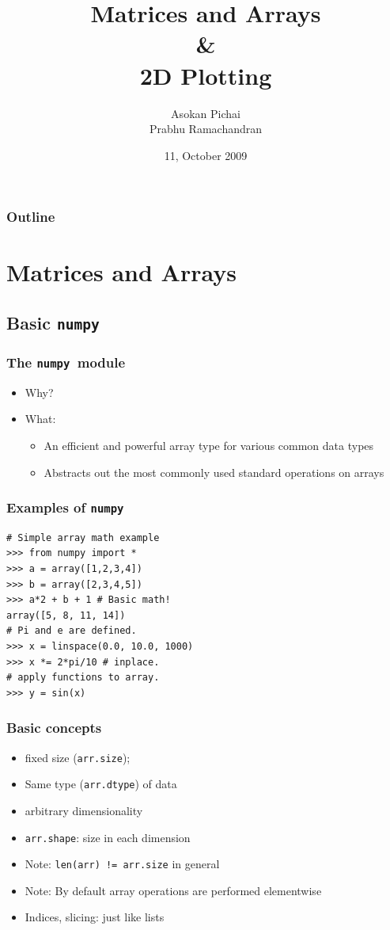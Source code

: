 \documentclass[14pt,compress]{beamer}
\title[]{Matrices and Arrays\\ \& \\2D Plotting}
\author[Asokan \& Prabhu] {Asokan Pichai\\Prabhu Ramachandran}
\institute[FOSSEE] {FOSSEE Team}
\date[] {11, October 2009}
\newcounter{time}
\newcommand{\inctime}[1]{\addtocounter{time}{#1}{\tiny \thetime\ m}}
\newcommand{\typ}[1]{\texttt{#1}}
\begin{document}
\begin{frame}
  \maketitle
\end{frame}

\begin{frame}
  \frametitle{Outline}
  \tableofcontents
\end{frame}

\section{Matrices and Arrays}

\subsection{Basic \typ{numpy} }

\newcommand{\num}{\texttt{numpy}}

\begin{frame}
  \frametitle{The \num\ module}
  \begin{itemize}
      \item Why?
  \item What:
    \begin{itemize}
    \item An efficient and powerful array type for various common data
      types
    \item Abstracts out the most commonly used standard operations on
      arrays
    \end{itemize}
  \end{itemize}
\end{frame}

\begin{frame}[fragile]
  \frametitle{Examples of \num}
\begin{lstlisting}
# Simple array math example
>>> from numpy import *
>>> a = array([1,2,3,4])
>>> b = array([2,3,4,5])
>>> a*2 + b + 1 # Basic math!
array([5, 8, 11, 14])
# Pi and e are defined.
>>> x = linspace(0.0, 10.0, 1000)
>>> x *= 2*pi/10 # inplace.
# apply functions to array.
>>> y = sin(x)
\end{lstlisting}
\inctime{5}
\end{frame}

\begin{frame}
  \frametitle{Basic concepts}
  \begin{itemize}
  \item fixed size (\typ{arr.size});
  \item Same type (\typ{arr.dtype}) of data
  \item arbitrary dimensionality
  \item \typ{arr.shape}: size in each dimension
  \item \alert{Note:} \typ{len(arr) != arr.size} in general
  \item \alert{Note:} By default array operations are performed
    \alert{elementwise}
  \item Indices, slicing: just like lists 
  \end{itemize}
\end{frame}
\end{document}
